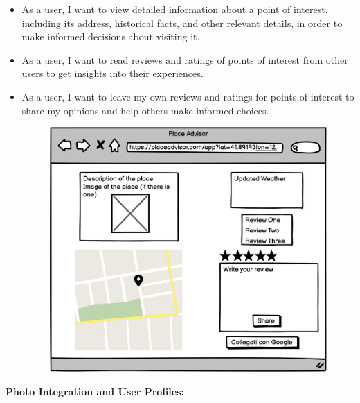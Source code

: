 \documentclass[../main.tex]{subfiles}
\begin{document}
\begin{itemize}
  \item As a user, I want to view detailed information about a point of interest, including its address, historical facts, and other relevant details, in order to make informed decisions about visiting it.
  \item As a user, I want to read reviews and ratings of points of interest from other users to get insights into their experiences.
  \item As a user, I want to leave my own reviews and ratings for points of interest to share my opinions and help others make informed choices.
  \begin{figure}[H]
	\centering
	\label{fig:pngegg}
	\includegraphics[width=0.5\linewidth]{../figures/mockup/US7.png}
  \end{figure}
\end{itemize}
\pagebreak
\textbf{Photo Integration and User Profiles:}
\end{document}
